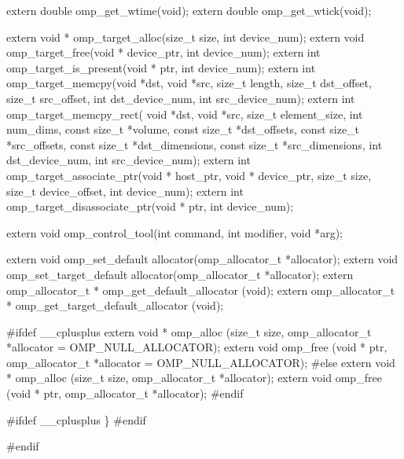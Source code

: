 {\begin{codepar}
extern double omp\_get\_wtime(void);
extern double omp\_get\_wtick(void);

extern void * omp\_target\_alloc(size\_t size, int device\_num);
extern void omp\_target\_free(void * device\_ptr, int device\_num);
extern int omp\_target\_is\_present(void * ptr, int device\_num);
extern int omp\_target\_memcpy(void *dst, void *src, size\_t length,
                              size\_t dst\_offset, size\_t src\_offset,
                              int dst\_device\_num, int src\_device\_num);
extern int omp\_target\_memcpy\_rect(
    void *dst, void *src,
    size\_t element\_size,
    int num\_dims,
    const size\_t *volume,
    const size\_t *dst\_offsets,
    const size\_t *src\_offsets,
    const size\_t *dst\_dimensions,
    const size\_t *src\_dimensions,
    int dst\_device\_num, int src\_device\_num);
extern int omp\_target\_associate\_ptr(void * host\_ptr,
                                       void * device\_ptr,
                                       size\_t size,
                                       size\_t device\_offset,
                                       int device\_num);
extern int omp\_target\_disassociate\_ptr(void * ptr,
                                          int device\_num);

extern void omp\_control\_tool(int command, int modifier, void *arg);

extern void omp\_set\_default allocator(omp\_allocator\_t *allocator);
extern void omp\_set\_target\_default allocator(omp\_allocator\_t *allocator);
extern omp\_allocator\_t * omp\_get\_default\_allocator (void);
extern omp\_allocator\_t * omp\_get\_target\_default\_allocator (void);

\#ifdef _\_cplusplus
extern void * omp\_alloc (size\_t size, omp\_allocator\_t *allocator = OMP\_NULL\_ALLOCATOR);
extern void omp\_free (void * ptr, omp\_allocator\_t *allocator = OMP\_NULL\_ALLOCATOR);
\#else
extern void * omp\_alloc (size\_t size, omp\_allocator\_t *allocator);
extern void omp\_free (void * ptr, omp\_allocator\_t *allocator);
\#endif


\#ifdef _\_cplusplus
\}
\#endif

\#endif
\end{codepar}} %

\pagebreak
